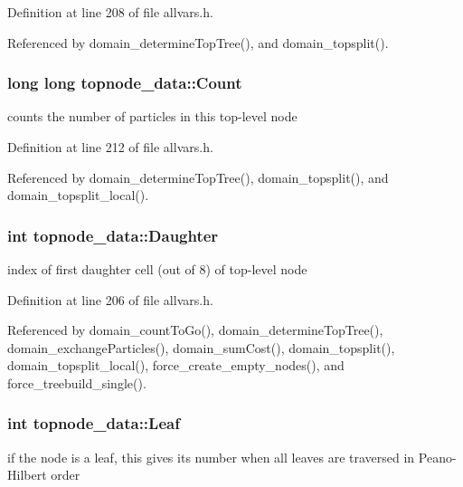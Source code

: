Definition at line 208 of file allvars.h.



Referenced by domain\_\-determineTopTree(), and domain\_\-topsplit().

\hypertarget{structtopnode__data_a3cae714f1f71f6ce4750004ee6fbda06}{
\subsubsection[{Count}]{\setlength{\rightskip}{0pt plus 5cm}long long {\bf topnode\_\-data::Count}}}
\label{structtopnode__data_a3cae714f1f71f6ce4750004ee6fbda06}
counts the number of particles in this top-\/level node 

Definition at line 212 of file allvars.h.



Referenced by domain\_\-determineTopTree(), domain\_\-topsplit(), and domain\_\-topsplit\_\-local().

\hypertarget{structtopnode__data_ad2e76e39d74f3c299b38fa680ecdb794}{
\subsubsection[{Daughter}]{\setlength{\rightskip}{0pt plus 5cm}int {\bf topnode\_\-data::Daughter}}}
\label{structtopnode__data_ad2e76e39d74f3c299b38fa680ecdb794}
index of first daughter cell (out of 8) of top-\/level node 

Definition at line 206 of file allvars.h.



Referenced by domain\_\-countToGo(), domain\_\-determineTopTree(), domain\_\-exchangeParticles(), domain\_\-sumCost(), domain\_\-topsplit(), domain\_\-topsplit\_\-local(), force\_\-create\_\-empty\_\-nodes(), and force\_\-treebuild\_\-single().

\hypertarget{structtopnode__data_aa5c48f2ae0bd1e2ed8ca069e4eeb29cd}{
\subsubsection[{Leaf}]{\setlength{\rightskip}{0pt plus 5cm}int {\bf topnode\_\-data::Leaf}}}
\label{structtopnode__data_aa5c48f2ae0bd1e2ed8ca069e4eeb29cd}
if the node is a leaf, this gives its number when all leaves are traversed in Peano-\/Hilbert order 

